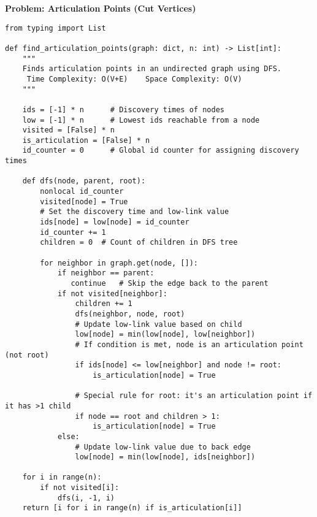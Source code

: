 \noindent\textbf{Problem: Articulation Points (Cut Vertices)}
\begin{center}
\end{center}
\begin{verbatim}
from typing import List

def find_articulation_points(graph: dict, n: int) -> List[int]:
    """
    Finds articulation points in an undirected graph using DFS.
     Time Complexity: O(V+E)    Space Complexity: O(V)
    """
    
    ids = [-1] * n      # Discovery times of nodes
    low = [-1] * n      # Lowest ids reachable from a node
    visited = [False] * n
    is_articulation = [False] * n
    id_counter = 0      # Global id counter for assigning discovery times

    def dfs(node, parent, root):
        nonlocal id_counter
        visited[node] = True
        # Set the discovery time and low-link value
        ids[node] = low[node] = id_counter
        id_counter += 1
        children = 0  # Count of children in DFS tree

        for neighbor in graph.get(node, []):
            if neighbor == parent:
               continue   # Skip the edge back to the parent
            if not visited[neighbor]:
                children += 1
                dfs(neighbor, node, root)
                # Update low-link value based on child
                low[node] = min(low[node], low[neighbor])
                # If condition is met, node is an articulation point (not root)
                if ids[node] <= low[neighbor] and node != root:
                    is_articulation[node] = True

                # Special rule for root: it's an articulation point if it has >1 child
                if node == root and children > 1:
                    is_articulation[node] = True
            else:
                # Update low-link value due to back edge
                low[node] = min(low[node], ids[neighbor])

    for i in range(n):
        if not visited[i]:
            dfs(i, -1, i)
    return [i for i in range(n) if is_articulation[i]]
\end{verbatim} 


